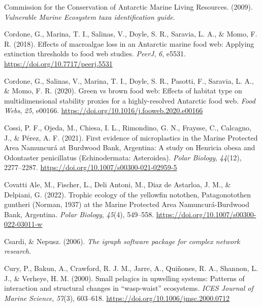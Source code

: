 \documentclass[preprint, 3p,
authoryear]{elsarticle} %
\newlength{\cslhangindent}
\newlength{\cslentryspacingunit} %
\newenvironment{CSLReferences}[2] %
 {%
  \setlength{\parindent}{0pt}
  \ifodd #1
  \let\oldpar\par
  \def\par{\hangindent=\cslhangindent\oldpar}
  \fi
  \setlength{\parskip}{#2\cslentryspacingunit}
 }%
 {}
\begin{document}
\begin{CSLReferences}{1}{0}
\leavevmode{}%
Commission for the Conservation of Antarctic Marine Living Resources.
(2009). \emph{Vulnerable {Marine Ecosystem} taxa identification guide}.

\leavevmode{}%
Cordone, G., Marina, T. I., Salinas, V., Doyle, S. R., Saravia, L. A.,
\& Momo, F. R. (2018). Effects of macroalgae loss in an {Antarctic}
marine food web: Applying extinction thresholds to food web studies.
\emph{PeerJ}, \emph{6}, e5531. \url{https://doi.org/10.7717/peerj.5531}

\leavevmode{}%
Cordone, G., Salinas, V., Marina, T. I., Doyle, S. R., Pasotti, F.,
Saravia, L. A., \& Momo, F. R. (2020). Green vs brown food web:
{Effects} of habitat type on multidimensional stability proxies for a
highly-resolved {Antarctic} food web. \emph{Food Webs}, \emph{25},
e00166. \url{https://doi.org/10.1016/j.fooweb.2020.e00166}

\leavevmode{}%
Cossi, P. F., Ojeda, M., Chiesa, I. L., Rimondino, G. N., Fraysse, C.,
Calcagno, J., \& Pérez, A. F. (2021). First evidence of microplastics in
the {Marine Protected Area Namuncurá} at {Burdwood Bank}, {Argentina}: A
study on {Henricia} obesa and {Odontaster} penicillatus
({Echinodermata}: {Asteroidea}). \emph{Polar Biology}, \emph{44}(12),
2277--2287. \url{https://doi.org/10.1007/s00300-021-02959-5}

\leavevmode{}%
Covatti Ale, M., Fischer, L., Deli Antoni, M., Diaz de Astarloa, J. M.,
\& Delpiani, G. (2022). Trophic ecology of the yellowfin notothen,
{Patagonotothen} guntheri ({Norman}, 1937) at the {Marine Protected Area
Namuncurá-Burdwood Bank}, {Argentina}. \emph{Polar Biology},
\emph{45}(4), 549--558. \url{https://doi.org/10.1007/s00300-022-03011-w}

\leavevmode{}%
Csardi, \& Nepusz. (2006). \emph{The igraph software package for complex
network research}.

\leavevmode{}%
Cury, P., Bakun, A., Crawford, R. J. M., Jarre, A., Quiñones, R. A.,
Shannon, L. J., \& Verheye, H. M. (2000). Small pelagics in upwelling
systems: Patterns of interaction and structural changes in
{``wasp-waist''} ecosystems. \emph{ICES Journal of Marine Science},
\emph{57}(3), 603--618. \url{https://doi.org/10.1006/jmsc.2000.0712}


\end{CSLReferences}
\end{document}
